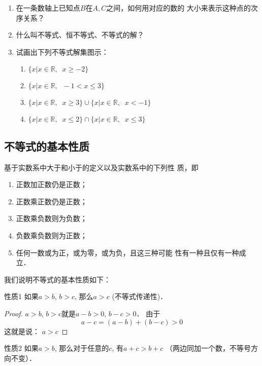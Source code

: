 \begin{ex}
    \begin{enumerate}
    \item 在一条数轴上已知点$B$在$A,C$之间，如何用对应的数的
    大小来表示这种点的次序关系？
    \item 什么叫不等式、恒不等式、不等式的解？
    \item 试画出下列不等式解集图示：
    \begin{enumerate}
        \item $\{x|x\in\mathbb{R},\;\;x\ge -2\}$
        \item $\{x|x\in\mathbb{R},\;\;-1<x\le 3\}$
        \item $\{x|x\in\mathbb{R},\;\;x\ge 3\}\cup\{x|x\in\mathbb{R},\;\; x<-1\}$
        \item $\{x|x\in\mathbb{R},\;\;x\le 2\}\cap \{x|x\in\mathbb{R},\;\; x\le 3\}$
    \end{enumerate}
    
\end{enumerate}
\end{ex}

\subsection{不等式的基本性质}
基于实数系中大于和小于的定义以及实数系中的下列性
质，即
\begin{blk}{}
\begin{enumerate}
    \item 正数加正数仍是正数；
    \item 正数乘正数仍是正数；
    \item 正数乘负数则为负数；
    \item 负数乘负数则为正数；
    \item 任何一数或为正，或为零，或为负，且这三种可能
性有一种且仅有一种成立．
\end{enumerate}
\end{blk}

我们说明不等式的基本性质如下：
\begin{blk}{性质1}
    如果$a>b$, $b>c$, 那么$a>c$ (不等式传递性)．
\end{blk}

\begin{proof}
    $a>b$, $b>c$就是$a-b>0$, $b-c>0$．
由于
$$a-c=(a-b)+(b-c)>0$$
这就是说：
$a>c$    
\end{proof}

\begin{blk}{性质2}
    如果$a>b$, 那么对于任意的$c$, 有$a+c>b+c$
（两边同加一个数，不等号方向不变）．
\end{blk}

